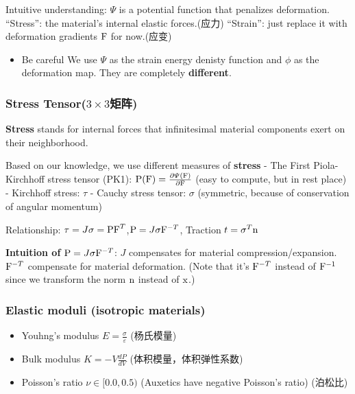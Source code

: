\documentclass[11pt]{article}
\providecommand{\tightlist}{%
      \setlength{\itemsep}{0pt}\setlength{\parskip}{0pt}}
\begin{document}
Intuitive understanding: \(\varPsi\) is a potential function that
penalizes deformation. ``Stress'': the material's internal elastic
forces.(应力) ``Strain'': just replace it with deformation gradients
\({\rm F}\) for now.(应变)

\begin{itemize}
\tightlist
\item
  Be careful We use \(\varPsi\) as the strain energy denisty function
  and \(\phi\) as the deformation map. They are completely
  \textbf{different}.
\end{itemize}

\hypertarget{stress-tensor3times-3ux77e9ux9635}{%
\subsubsection{\texorpdfstring{Stress
Tensor(\(3\times 3\)矩阵)}{Stress Tensor(3\textbackslash times 3矩阵)}}\label{stress-tensor3times-3ux77e9ux9635}}

\textbf{Stress} stands for internal forces that infinitesimal material
components exert on their neighborhood.

Based on our knowledge, we use different measures of \textbf{stress} -
The First Piola-Kirchhoff stress tensor (PK1):
\({\rm P(F)}=\frac{\partial\varPsi({\rm F})}{\partial {\rm F}}\) (easy
to compute, but in rest place) - Kirchhoff stress: \(\tau\) - Cauchy
stress tensor: \(\sigma\) (symmetric, because of conservation of angular
momentum)

Relationship:
\(\tau=J\sigma={\rm PF}^{T}\),\({\rm P}=J\sigma{\rm F}^{-T}\), Traction
\(t=\sigma^{T}{\rm n}\)

\textbf{Intuition of} \({\rm P}=J\sigma{\rm F}^{-T}\): \(J\) compensates
for material compression/expansion. \({\rm F}^{-T}\) compensate for
material deformation. (Note that it's \({\rm F}^{-T}\) instead of
\({\rm F}^{-1}\) since we transform the norm \(\rm n\) instead of
\(\rm x\).)

\hypertarget{elastic-moduli-isotropic-materials}{%
\subsubsection{Elastic moduli (isotropic
materials)}\label{elastic-moduli-isotropic-materials}}

\begin{itemize}
\tightlist
\item
  Youhng's modulus \(E=\displaystyle\frac{\sigma}{\varepsilon}\)
  (杨氏模量)
\item
  Bulk modulus \(K=-V\displaystyle\frac{dP}{dV}\)
  (体积模量，体积弹性系数)
\item
  Poisson's ratio \(\nu\in [0.0,0.5)\) (Auxetics have negative Poisson's
  ratio) (泊松比)
\end{itemize}
\end{document}
